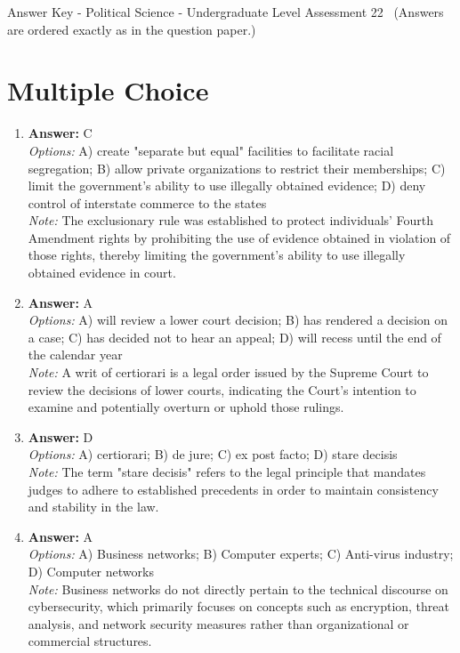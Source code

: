 \documentclass[12pt]{article}
\begin{document}
\begin{center}
Answer Key - Political Science - Undergraduate Level Assessment 22 \
\small (Answers are ordered exactly as in the question paper.)
\end{center}

\section*{Multiple Choice}
\begin{enumerate}[label=\arabic*.]
\item \textbf{Answer:} C
\\ \textit{Options:} A) create "separate but equal" facilities to facilitate racial segregation; B) allow private organizations to restrict their memberships; C) limit the government's ability to use illegally obtained evidence; D) deny control of interstate commerce to the states
\\ \textit{Note:} The exclusionary rule was established to protect individuals' Fourth Amendment rights by prohibiting the use of evidence obtained in violation of those rights, thereby limiting the government's ability to use illegally obtained evidence in court.
\item \textbf{Answer:} A
\\ \textit{Options:} A) will review a lower court decision; B) has rendered a decision on a case; C) has decided not to hear an appeal; D) will recess until the end of the calendar year
\\ \textit{Note:} A writ of certiorari is a legal order issued by the Supreme Court to review the decisions of lower courts, indicating the Court's intention to examine and potentially overturn or uphold those rulings.
\item \textbf{Answer:} D
\\ \textit{Options:} A) certiorari; B) de jure; C) ex post facto; D) stare decisis
\\ \textit{Note:} The term "stare decisis" refers to the legal principle that mandates judges to adhere to established precedents in order to maintain consistency and stability in the law.
\item \textbf{Answer:} A
\\ \textit{Options:} A) Business networks; B) Computer experts; C) Anti-virus industry; D) Computer networks
\\ \textit{Note:} Business networks do not directly pertain to the technical discourse on cybersecurity, which primarily focuses on concepts such as encryption, threat analysis, and network security measures rather than organizational or commercial structures.

\end{enumerate}
\end{document}
